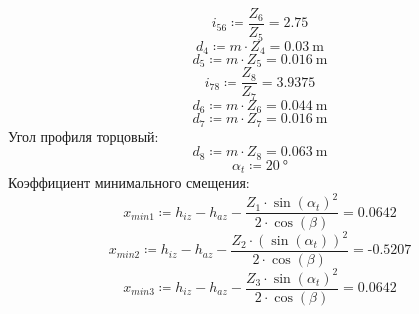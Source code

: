 \documentclass{article}
\newcommand{\defeq}{\coloneq} %
\begin{document}
\begin{equation*}
\textit{i}_{\textit{56}} \defeq \frac{\textit{Z}_{\textit{6}}}{\textit{Z}_{\textit{5}}} = {2.75}
\end{equation*}
\begin{equation*}
\textit{d}_{\textit{4}} \defeq m \cdot \textit{Z}_{\textit{4}} = {0.03 \: \mathrm{m}}
\end{equation*}
\begin{equation*}
\textit{d}_{\textit{5}} \defeq m \cdot \textit{Z}_{\textit{5}} = {0.016 \: \mathrm{m}}
\end{equation*}
\begin{equation*}
\textit{i}_{\textit{78}} \defeq \frac{\textit{Z}_{\textit{8}}}{\textit{Z}_{\textit{7}}} = {3.9375}
\end{equation*}
\begin{equation*}
\textit{d}_{\textit{6}} \defeq m \cdot \textit{Z}_{\textit{6}} = {0.044 \: \mathrm{m}}
\end{equation*}
\begin{equation*}
\textit{d}_{\textit{7}} \defeq m \cdot \textit{Z}_{\textit{7}} = {0.016 \: \mathrm{m}}
\end{equation*}
\colorbox[HTML]{000000}{Угол профиля торцовый:}\newline
\begin{equation*}
\textit{d}_{\textit{8}} \defeq m \cdot \textit{Z}_{\textit{8}} = {0.063 \: \mathrm{m}}
\end{equation*}
\begin{equation*}
α_{t} \defeq 20 \: \mathrm{°}
\end{equation*}
\colorbox[HTML]{000000}{Коэффициент минимального смещения:}\newline
\begin{equation*}
\textit{x}_{\textit{min1}} \defeq h_{iz}-h_{az}-\frac{\textit{Z}_{\textit{1}} \cdot \sin \left( α_{t} \right)^{2}}{2 \cdot \cos \left( {\beta} \right)} = {0.0642}
\end{equation*}
\begin{equation*}
\textit{x}_{\textit{min2}} \defeq h_{iz}-h_{az}-\frac{\textit{Z}_{\textit{2}} \cdot \left( \sin \left( α_{t} \right) \right)^{2}}{2 \cdot \cos \left( {\beta} \right)} = { \operatorname{-} 0.5207}
\end{equation*}
\begin{equation*}
\textit{x}_{\textit{min3}} \defeq h_{iz}-h_{az}-\frac{\textit{Z}_{\textit{3}} \cdot \sin \left( α_{t} \right)^{2}}{2 \cdot \cos \left( {\beta} \right)} = {0.0642}
\end{equation*}
\end{document}
